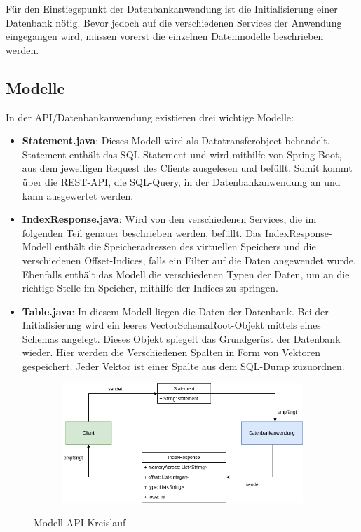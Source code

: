 Für den Einstiegspunkt der Datenbankanwendung ist die Initialisierung einer Datenbank nötig. Bevor jedoch auf die verschiedenen Services der Anwendung eingegangen wird, müssen vorerst die einzelnen Datenmodelle beschrieben werden. 

\subsection{Modelle}
\label{Modelle}

In der API/Datenbankanwendung existieren drei wichtige Modelle:

\begin{itemize}
 \item \textbf{Statement.java}: Dieses Modell wird als Datatransferobject behandelt. Statement enthält das SQL-Statement und wird mithilfe von Spring Boot, aus dem jeweiligen Request des Clients ausgelesen und befüllt. Somit kommt über die REST-API, die SQL-Query, in der Datenbankanwendung an und kann ausgewertet werden.
 \item \textbf{IndexResponse.java}: Wird von den verschiedenen Services, die im folgenden Teil genauer beschrieben werden, befüllt. Das IndexResponse-Modell enthält die Speicheradressen des virtuellen Speichers und die verschiedenen Offset-Indices, falls ein Filter auf die Daten angewendet wurde. Ebenfalls enthält das Modell die verschiedenen Typen der Daten, um an die richtige Stelle im Speicher, mithilfe der Indices zu springen.
 \item \textbf{Table.java}: In diesem Modell liegen die Daten der Datenbank. Bei der Initialisierung wird ein leeres VectorSchemaRoot-Objekt mittels eines Schemas angelegt. Dieses Objekt spiegelt das Grundgerüst der Datenbank wieder. Hier werden die Verschiedenen Spalten in Form von Vektoren gespeichert. Jeder Vektor ist einer Spalte aus dem SQL-Dump zuzuordnen.
\end{itemize}

\begin{figure}[h]
  \centering
  \begin{subfigure}[b]{1.0\textwidth}
    \includegraphics[width=1.0\linewidth]{img/sendrecieve}
  \end{subfigure}
  \caption{Modell-API-Kreislauf}
  \label{graf_2}
\end{figure}

